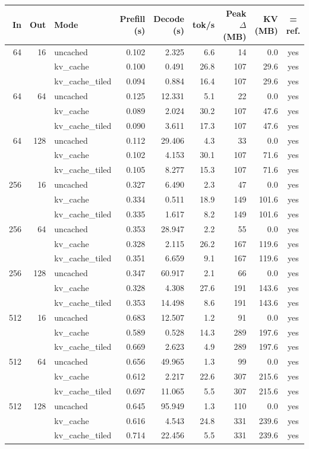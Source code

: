 \begin{tabular}{rrlrrrrrc}\toprule
In & Out & Mode & Prefill (s) & Decode (s) & tok/s & Peak $\Delta$ (MB) & KV (MB) & = ref. \\\midrule
64 & 16 & uncached & 0.102 & 2.325 & 6.6 & 14 & 0.0 & yes \\
 &  & kv\_cache & 0.100 & 0.491 & 26.8 & 107 & 29.6 & yes \\
 &  & kv\_cache\_tiled & 0.094 & 0.884 & 16.4 & 107 & 29.6 & yes \\
64 & 64 & uncached & 0.125 & 12.331 & 5.1 & 22 & 0.0 & yes \\
 &  & kv\_cache & 0.089 & 2.024 & 30.2 & 107 & 47.6 & yes \\
 &  & kv\_cache\_tiled & 0.090 & 3.611 & 17.3 & 107 & 47.6 & yes \\
64 & 128 & uncached & 0.112 & 29.406 & 4.3 & 33 & 0.0 & yes \\
 &  & kv\_cache & 0.102 & 4.153 & 30.1 & 107 & 71.6 & yes \\
 &  & kv\_cache\_tiled & 0.105 & 8.277 & 15.3 & 107 & 71.6 & yes \\
256 & 16 & uncached & 0.327 & 6.490 & 2.3 & 47 & 0.0 & yes \\
 &  & kv\_cache & 0.334 & 0.511 & 18.9 & 149 & 101.6 & yes \\
 &  & kv\_cache\_tiled & 0.335 & 1.617 & 8.2 & 149 & 101.6 & yes \\
256 & 64 & uncached & 0.353 & 28.947 & 2.2 & 55 & 0.0 & yes \\
 &  & kv\_cache & 0.328 & 2.115 & 26.2 & 167 & 119.6 & yes \\
 &  & kv\_cache\_tiled & 0.351 & 6.659 & 9.1 & 167 & 119.6 & yes \\
256 & 128 & uncached & 0.347 & 60.917 & 2.1 & 66 & 0.0 & yes \\
 &  & kv\_cache & 0.328 & 4.308 & 27.6 & 191 & 143.6 & yes \\
 &  & kv\_cache\_tiled & 0.353 & 14.498 & 8.6 & 191 & 143.6 & yes \\
512 & 16 & uncached & 0.683 & 12.507 & 1.2 & 91 & 0.0 & yes \\
 &  & kv\_cache & 0.589 & 0.528 & 14.3 & 289 & 197.6 & yes \\
 &  & kv\_cache\_tiled & 0.669 & 2.623 & 4.9 & 289 & 197.6 & yes \\
512 & 64 & uncached & 0.656 & 49.965 & 1.3 & 99 & 0.0 & yes \\
 &  & kv\_cache & 0.612 & 2.217 & 22.6 & 307 & 215.6 & yes \\
 &  & kv\_cache\_tiled & 0.697 & 11.065 & 5.5 & 307 & 215.6 & yes \\
512 & 128 & uncached & 0.645 & 95.949 & 1.3 & 110 & 0.0 & yes \\
 &  & kv\_cache & 0.616 & 4.543 & 24.8 & 331 & 239.6 & yes \\
 &  & kv\_cache\_tiled & 0.714 & 22.456 & 5.5 & 331 & 239.6 & yes \\
\bottomrule\end{tabular}

